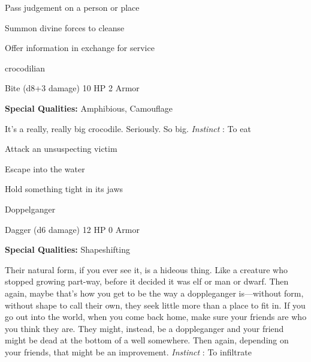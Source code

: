 \startitemize[1,packed]
         
\item Pass judgement on a person or place

         
\item Summon divine forces to cleanse

         
\item Offer information in exchange for service

       
\stopitemize
       
\startMonsterName
crocodilian	 
\stopMonsterName
       

Bite (d8+3 damage)	10 HP	2 Armor

       


       
\startMonsterQualities
         {\bf Special Qualities:}  Amphibious, Camouflage
\stopMonsterQualities
       
\startMonsterDescription
It’s a really, really big crocodile. Seriously. So big. {\em Instinct} : To eat
\stopMonsterDescription
       
\startitemize[1,packed]
         
\item Attack an unsuspecting victim

         
\item Escape into the water

         
\item Hold something tight in its jaws

       
\stopitemize
       
\startMonsterName
Doppelganger	 
\stopMonsterName
       

Dagger (d6 damage)	12 HP	0 Armor

       


       
\startMonsterQualities
         {\bf Special Qualities:}  Shapeshifting
\stopMonsterQualities
       
\startMonsterDescription
Their natural form, if you ever see it, is a hideous thing. Like a creature who stopped growing part-way, before it decided it was elf or man or dwarf. Then again, maybe that’s how you get to be the way a doppleganger is—without form, without shape to call their own, they seek little more than a place to fit in. If you go out into the world, when you come back home, make sure your friends are who you think they are. They might, instead, be a doppleganger and your friend might be dead at the bottom of a well somewhere. Then again, depending on your friends, that might be an improvement. {\em Instinct} : To infiltrate
\stopMonsterDescription
       
